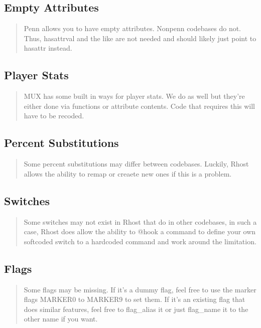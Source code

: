 \documentclass[letterpaper,10pt,english]{sphinxmanual}
\begin{document}
\subsection{Empty Attributes}
\label{\detokenize{differences:empty-attributes}}\begin{quote}

\sphinxAtStartPar
Penn allows you to have empty attributes.  Non\sphinxhyphen{}penn codebases do not.
Thus, hasattrval and the like are not needed and should likely just point
to hasattr instead.
\end{quote}


\subsection{Player Stats}
\label{\detokenize{differences:player-stats}}\begin{quote}

\sphinxAtStartPar
MUX has some built in ways for player stats.  We do as well but they’re
either done via functions or attribute contents.  Code that requires this
will have to be recoded.
\end{quote}


\subsection{Percent Substitutions}
\label{\detokenize{differences:percent-substitutions}}\begin{quote}

\sphinxAtStartPar
Some percent substitutions may differ between codebases.  Luckily, Rhost
allows the ability to remap or creaete new ones if this is a problem.
\end{quote}


\subsection{Switches}
\label{\detokenize{differences:switches}}\begin{quote}

\sphinxAtStartPar
Some switches may not exist in Rhost that do in other codebases, in such
a case, Rhost does allow the ability to @hook a command to define your own
softcoded switch to a hardcoded command and work around the limitation.
\end{quote}


\subsection{Flags}
\label{\detokenize{differences:id1}}\begin{quote}

\sphinxAtStartPar
Some flags may be missing.  If it’s a dummy flag, feel free to use the
marker flags MARKER0 to MARKER9 to set them.  If it’s an existing flag
that does similar features, feel free to flag\_alias it or just flag\_name
it to the other name if you want.
\end{quote}
\end{document}
